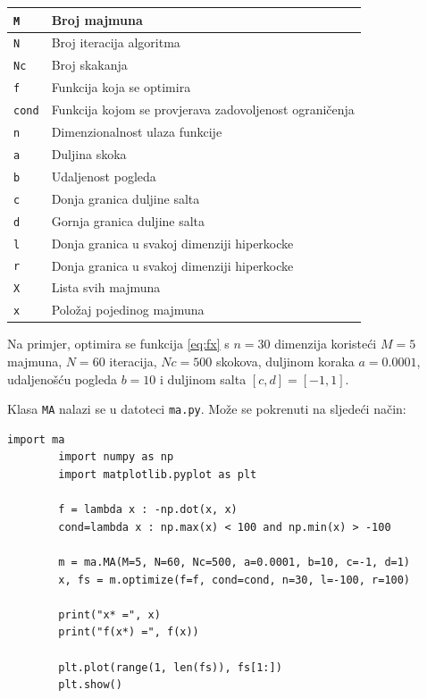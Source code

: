 \begin{tabular}{|m{1cm}|m{11cm}|}
	
	\hline
	\verb|M| & Broj majmuna \\
	\hline
	\verb|N| & Broj iteracija algoritma \\
	\hline
	\verb|Nc| & Broj skakanja \\
	\hline
	\verb|f| & Funkcija koja se optimira \\
	\hline
	\verb|cond| & Funkcija kojom se provjerava zadovoljenost ograničenja \\
	\hline
	\verb|n| & Dimenzionalnost ulaza funkcije \\
	\hline
	\verb|a| & Duljina skoka \\
	\hline
	\verb|b| & Udaljenost pogleda \\
	\hline
	\verb|c| & Donja granica duljine salta \\
	\hline
	\verb|d| & Gornja granica duljine salta \\
	\hline
	\verb|l| & Donja granica u svakoj dimenziji hiperkocke  \\
	\hline
	\verb|r| & Donja granica u svakoj dimenziji hiperkocke \\
	\hline
	\verb|X| & Lista svih majmuna \\
	\hline
	\verb|x| & Položaj pojedinog majmuna \\
	\hline
\end{tabular}


Na primjer, optimira se funkcija \eqref{eq:fx} s $n = 30$ dimenzija koristeći $M = 5$ majmuna, $N = 60$ iteracija, $Nc = 500$ skokova, duljinom koraka $a = 0.0001$, udaljenošću pogleda $b = 10$ i duljinom salta $[c, d] = [-1, 1]$.

Klasa \verb|MA| nalazi se u datoteci \verb|ma.py|. Može se pokrenuti na sljedeći način:


\begin{framed}
	\begin{verbatim}import ma
		import numpy as np
		import matplotlib.pyplot as plt
		
		f = lambda x : -np.dot(x, x)
		cond=lambda x : np.max(x) < 100 and np.min(x) > -100
		
		m = ma.MA(M=5, N=60, Nc=500, a=0.0001, b=10, c=-1, d=1)
		x, fs = m.optimize(f=f, cond=cond, n=30, l=-100, r=100)
		
		print("x* =", x)
		print("f(x*) =", f(x))
		
		plt.plot(range(1, len(fs)), fs[1:])
		plt.show()
	\end{verbatim}
\end{framed}

